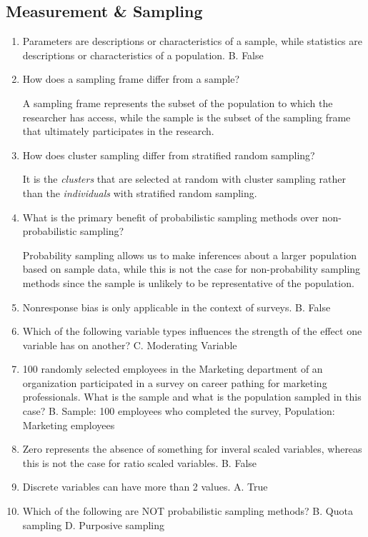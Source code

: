 \documentclass[]{book}
\begin{document}
\hypertarget{measurement-sampling}{%
\subsection{Measurement \& Sampling}\label{measurement-sampling}}

\begin{enumerate}
\def\labelenumi{\arabic{enumi}.}
\item
  Parameters are descriptions or characteristics of a sample, while statistics are descriptions or characteristics of a population.
  B. False
\item
  How does a sampling frame differ from a sample?

  A sampling frame represents the subset of the population to which the researcher has access, while the sample is the subset of the sampling frame that ultimately participates in the research.
\item
  How does cluster sampling differ from stratified random sampling?

  It is the \emph{clusters} that are selected at random with cluster sampling rather than the \emph{individuals} with stratified random sampling.
\item
  What is the primary benefit of probabilistic sampling methods over non-probabilistic sampling?

  Probability sampling allows us to make inferences about a larger population based on sample data, while this is not the case for non-probability sampling methods since the sample is unlikely to be representative of the population.
\item
  Nonresponse bias is only applicable in the context of surveys.
  B. False
\item
  Which of the following variable types influences the strength of the effect one variable has on another?
  C. Moderating Variable
\item
  100 randomly selected employees in the Marketing department of an organization participated in a survey on career pathing for marketing professionals. What is the sample and what is the population sampled in this case?
  B. Sample: 100 employees who completed the survey, Population: Marketing employees
\item
  Zero represents the absence of something for inveral scaled variables, whereas this is not the case for ratio scaled variables.
  B. False
\item
  Discrete variables can have more than 2 values.
  A. True
\item
  Which of the following are NOT probabilistic sampling methods?
  B. Quota sampling
  D. Purposive sampling
\end{enumerate}
\end{document}
